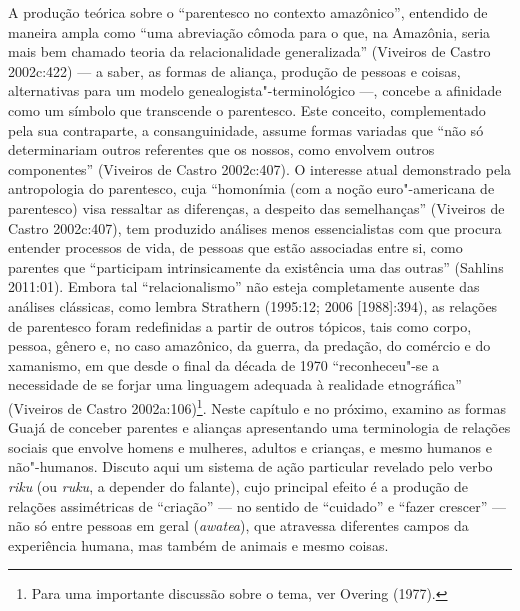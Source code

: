 A produção teórica sobre o ``parentesco no contexto amazônico'', entendido
de maneira ampla como ``uma abreviação cômoda para o que, na Amazônia,
seria mais bem chamado teoria da relacionalidade generalizada'' (Viveiros
de Castro 2002c:422) --- a saber, as formas de aliança, produção de
pessoas e coisas, alternativas para um modelo genealogista"-terminológico
---, concebe a afinidade como um símbolo que transcende o parentesco. Este
conceito, complementado pela sua contraparte, a consanguinidade, assume
formas variadas que ``não só determinariam outros referentes que os
nossos, como envolvem outros componentes'' (Viveiros de Castro
2002c:407). O interesse atual demonstrado pela antropologia do
parentesco, cuja ``homonímia (com a noção euro"-americana de parentesco)
visa ressaltar as diferenças, a despeito das semelhanças'' (Viveiros de
Castro 2002c:407), tem produzido análises menos essencialistas com que
procura entender processos de vida, de pessoas que estão associadas
entre si, como parentes que ``participam intrinsicamente da existência
uma das outras'' (Sahlins 2011:01). Embora tal ``relacionalismo'' não
esteja completamente ausente das análises clássicas, como lembra
Strathern (1995:12; 2006 {[}1988{]}:394), as relações de parentesco
foram redefinidas a partir de outros tópicos, tais como corpo, pessoa,
gênero e, no caso amazônico, da guerra, da predação, do comércio e do
xamanismo, em que desde o final da década de 1970 ``reconheceu"-se a
necessidade de se forjar uma linguagem adequada à realidade etnográfica''
(Viveiros de Castro 2002a:106)\footnote{Para uma importante discussão
  sobre o tema, ver Overing (1977).}. Neste capítulo e no próximo,
examino as formas Guajá de conceber parentes e alianças apresentando uma
terminologia de relações sociais que envolve homens e mulheres, adultos
e crianças, e mesmo humanos e não"-humanos. Discuto aqui um sistema de
ação particular revelado pelo verbo \emph{riku} (ou \emph{ruku}, a
depender do falante), cujo principal efeito é a produção de relações
assimétricas de ``criação'' --- no sentido de ``cuidado'' e ``fazer crescer'' ---
não só entre pessoas em geral (\emph{awatea}), que atravessa diferentes
campos da experiência humana, mas também de animais e mesmo coisas.

